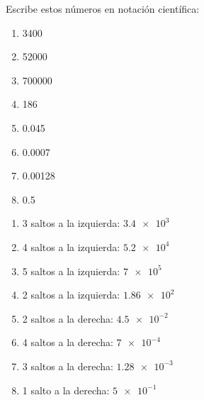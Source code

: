 \begin{exercise}
    Escribe estos números en notación científica:
    \begin{enumerate}[label=\letraminuscula]
        \item \num{3400}
        \item \num{52000}
        \item \num{700000}
        \item \num{186}
        \item \num{0.045}
        \item \num{0.0007}
        \item \num{0.00128}
        \item \num{0.5}
    \end{enumerate}
    \begin{solu}
        \begin{enumerate}[label=\alph*)]
            \item 3 saltos a la izquierda: \(\num{3.4e3}\)
            \item 4 saltos a la izquierda: \(\num{5.2e4}\)
            \item 5 saltos a la izquierda: \(\num{7e5}\)
            \item 2 saltos a la izquierda: \(\num{1.86e2}\)
            \item 2 saltos a la derecha: \(\num{4.5e-2}\)
            \item 4 saltos a la derecha: \(\num{7e-4}\)
            \item 3 saltos a la derecha: \(\num{1.28e-3}\)
            \item 1 salto a la derecha: \(\num{5e-1}\)
        \end{enumerate}
    \end{solu}
\end{exercise}

